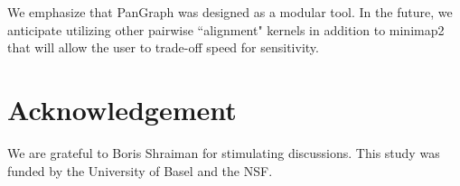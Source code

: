 \documentclass[aps,rmp,reprint,superscriptaddress,notitlepage,10pt]{revtex4-1}
\begin{document}
We emphasize that PanGraph was designed as a modular tool.
In the future, we anticipate utilizing other pairwise ``alignment" kernels in addition to minimap2 that will allow the user to trade-off speed for sensitivity.

\section*{Acknowledgement}
We are grateful to Boris Shraiman for stimulating discussions.
This study was funded by the University of Basel and the NSF.

{}
\end{document}
